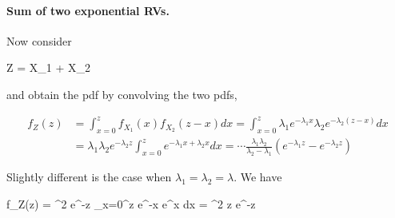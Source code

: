 \paragraph{Sum of two exponential RVs.} Now consider

\bee
Z = X_1 + X_2
\eee

and obtain the pdf by convolving the two pdfs,

\begin{align*}
f_Z(z) &= \int_{x=0}^z f_{X_1}(x) f_{X_2}(z - x) dx = \int_{x=0}^z \lambda_1 e^{-\lambda_1 x} \lambda_2 e^{-\lambda_2(z-x)} dx \\ &= \lambda_1 \lambda_2 e^{-\lambda_2 z} \int_{x=0}^z e^{-\lambda_1 x + \lambda_2 x} dx = \cdots \frac{\lambda_1 \lambda_2}{\lambda_2 - \lambda_1} \left( e^{-\lambda_1 z} - e^{-\lambda_2 z} \right)
\end{align*}

Slightly different is the case when $\lambda_1 = \lambda_2 = \lambda$. We have

\bee
f_Z(z) = \lambda^2 e^{-\lambda z} \int_{x=0}^z e^{-\lambda x} e^{\lambda x} dx = \lambda^2 z e^{-\lambda z}
\eee

